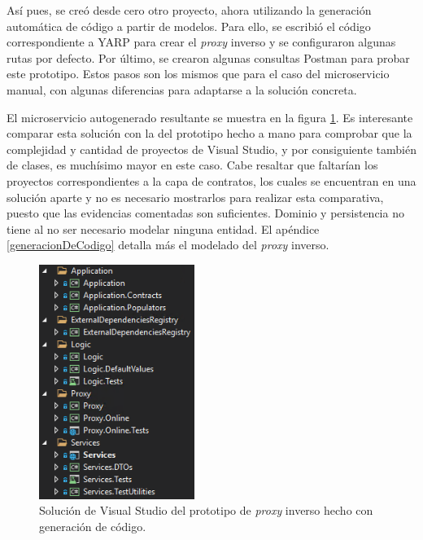 \documentclass[11pt,spanish,listoffigures]{tfgetsinf}
\begin{document}
Así pues, se creó desde cero otro proyecto, ahora utilizando la generación automática de código a partir de modelos. Para ello, se escribió el código correspondiente a YARP para crear el \emph{proxy} inverso y se configuraron algunas rutas por defecto. Por último, se crearon algunas consultas Postman para probar este prototipo. Estos pasos son los mismos que para el caso del microservicio manual, con algunas diferencias para adaptarse a la solución concreta.

El microservicio autogenerado resultante se muestra en la figura \ref{prototipoAutogenerado}. Es interesante comparar esta solución con la del prototipo hecho a mano para comprobar que la complejidad y cantidad de proyectos de Visual Studio, y por consiguiente también de clases, es muchísimo mayor en este caso. Cabe resaltar que faltarían los proyectos correspondientes a la capa de contratos, los cuales se encuentran en una solución aparte y no es necesario mostrarlos para realizar esta comparativa, puesto que las evidencias comentadas son suficientes. Dominio y persistencia no tiene al no ser necesario modelar ninguna entidad. El apéndice \ref{generacionDeCodigo} detalla más el modelado del \emph{proxy} inverso.

\begin{figure}[ht]
\centering
\includegraphics[width=0.45\textwidth]{imagenes/prototipoAutogenerado}
\caption{Solución de Visual Studio del prototipo de \emph{proxy} inverso hecho con generación de código.}
	\label{prototipoAutogenerado}
\end{figure}

\end{document}
